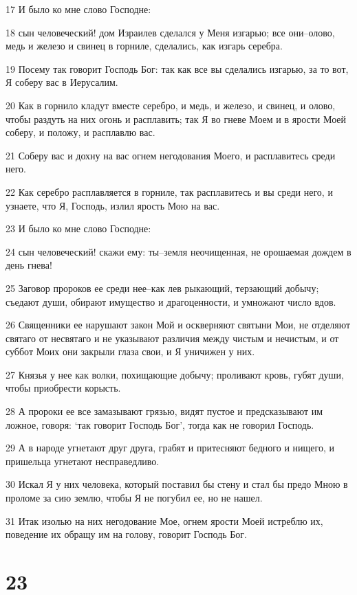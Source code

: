 \par 17 И было ко мне слово Господне:
\par 18 сын человеческий! дом Израилев сделался у Меня изгарью; все они--олово, медь и железо и свинец в горниле, сделались, как изгарь серебра.
\par 19 Посему так говорит Господь Бог: так как все вы сделались изгарью, за то вот, Я соберу вас в Иерусалим.
\par 20 Как в горнило кладут вместе серебро, и медь, и железо, и свинец, и олово, чтобы раздуть на них огонь и расплавить; так Я во гневе Моем и в ярости Моей соберу, и положу, и расплавлю вас.
\par 21 Соберу вас и дохну на вас огнем негодования Моего, и расплавитесь среди него.
\par 22 Как серебро расплавляется в горниле, так расплавитесь и вы среди него, и узнаете, что Я, Господь, излил ярость Мою на вас.
\par 23 И было ко мне слово Господне:
\par 24 сын человеческий! скажи ему: ты--земля неочищенная, не орошаемая дождем в день гнева!
\par 25 Заговор пророков ее среди нее--как лев рыкающий, терзающий добычу; съедают души, обирают имущество и драгоценности, и умножают число вдов.
\par 26 Священники ее нарушают закон Мой и оскверняют святыни Мои, не отделяют святаго от несвятаго и не указывают различия между чистым и нечистым, и от суббот Моих они закрыли глаза свои, и Я уничижен у них.
\par 27 Князья у нее как волки, похищающие добычу; проливают кровь, губят души, чтобы приобрести корысть.
\par 28 А пророки ее все замазывают грязью, видят пустое и предсказывают им ложное, говоря: `так говорит Господь Бог', тогда как не говорил Господь.
\par 29 А в народе угнетают друг друга, грабят и притесняют бедного и нищего, и пришельца угнетают несправедливо.
\par 30 Искал Я у них человека, который поставил бы стену и стал бы предо Мною в проломе за сию землю, чтобы Я не погубил ее, но не нашел.
\par 31 Итак изолью на них негодование Мое, огнем ярости Моей истреблю их, поведение их обращу им на голову, говорит Господь Бог.

\chapter{23}

